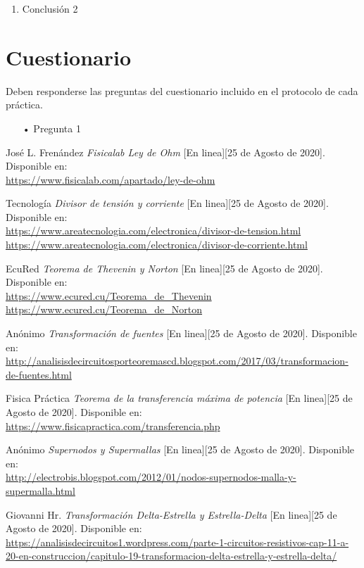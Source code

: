 \documentclass[osajnl,showpacs,superscriptaddress,10pt]{article}
\begin{document}
\begin{multicols}{2}
\begin{enumerate}
\item Conclusión 2
\end{enumerate}


\section{Cuestionario}

Deben responderse las preguntas del cuestionario incluido en el protocolo de cada práctica.


\begin{enumerate}
  		\item[•] Pregunta 1
\end{enumerate}





\end{multicols}
\begin{thebibliography}{99}

\bibitem{}José L. Frenández \textit{Fisicalab Ley de Ohm} [En linea][25 de Agosto de 2020]. Disponible en:\\ \url{https://www.fisicalab.com/apartado/ley-de-ohm}

\bibitem{}Tecnología \textit{Divisor de tensión y corriente} [En linea][25 de Agosto de 2020]. Disponible en:\\ \url{https://www.areatecnologia.com/electronica/divisor-de-tension.html}\\
\url{https://www.areatecnologia.com/electronica/divisor-de-corriente.html}

\bibitem{}EcuRed \textit{Teorema de Thevenin y Norton} [En linea][25 de Agosto de 2020]. Disponible en:\\ \url{https://www.ecured.cu/Teorema_de_Thevenin}
\url{https://www.ecured.cu/Teorema_de_Norton}

\bibitem{}Anónimo \textit{Transformación de fuentes} [En linea][25 de Agosto de 2020]. Disponible en:\\ \url{http://analisisdecircuitosporteoremascd.blogspot.com/2017/03/transformacion-de-fuentes.html}

\bibitem{}Fisica Práctica \textit{Teorema de la transferencia máxima de potencia} [En linea][25 de Agosto de 2020]. Disponible en:\\ \url{https://www.fisicapractica.com/transferencia.php}

\bibitem{}Anónimo \textit{Supernodos y Supermallas} [En linea][25 de Agosto de 2020]. Disponible en:\\ \url{http://electrobis.blogspot.com/2012/01/nodos-supernodos-malla-y-supermalla.html}

\bibitem{}Giovanni Hr. \textit{Transformación Delta-Estrella y Estrella-Delta} [En linea][25 de Agosto de 2020]. Disponible en:\\ \url{https://analisisdecircuitos1.wordpress.com/parte-1-circuitos-resistivos-cap-11-a-20-en-construccion/capitulo-19-transformacion-delta-estrella-y-estrella-delta/}
\end{thebibliography}
\end{document}
